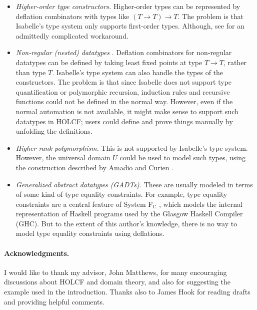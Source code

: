 \documentclass{llncs}
\begin{document}
\begin{itemize}

\item \emph{Higher-order type constructors.} Higher-order types can be
  represented by deflation combinators with types like $(T \rightarrow
  T) \rightarrow T$.  The problem is that Isabelle's type system only
  supports first-order types.  Although, see \cite{huffman05axiomatic}
  for an admittedly complicated workaround.

\item \emph{Non-regular (nested) datatypes} \cite{bird98nested}.
  Deflation combinators for non-regular datatypes can be defined by
  taking least fixed points at type $T \rightarrow T$, rather than
  type $T$.  Isabelle's type system can also handle the types of the
  constructors.  The problem is that since Isabelle does not support
  type quantification or polymorphic recursion, induction rules and
  recursive functions could not be defined in the normal way.
  However, even if the normal automation is not available, it might
  make sense to support such datatypes in HOLCF; users could define
  and prove things manually by unfolding the definitions.

\item \emph{Higher-rank polymorphism.}  This is not supported by
  Isabelle's type system.  However, the universal domain $U$ could be
  used to model such types, using the construction described by Amadio
  and Curien \cite{amadio+curien}.

\item \emph{Generalized abstract datatypes (GADTs).}  These are
  usually modeled in terms of some kind of type equality constraints.
  For example, type equality constraints are a central feature of
  System F$_\mathrm{C}$ \cite{system-fc}, which models the internal
  representation of Haskell programs used by the Glasgow Haskell
  Compiler (GHC).  But to the extent of this author's knowledge, there
  is no way to model type equality constraints using deflations.

\end{itemize}

\paragraph{Acknowledgments.}
I would like to thank my advisor, John Matthews, for many encouraging
discussions about HOLCF and domain theory, and also for suggesting the
example used in the introduction.  Thanks also to James Hook for
reading drafts and providing helpful comments.



\end{document}
